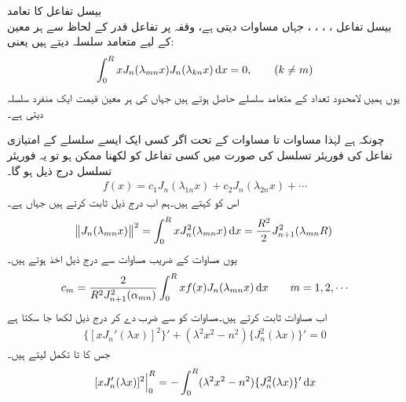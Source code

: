 \quad بیسل تفاعل کا تعامد\\
بیسل تفاعل ، ، ، ، جہاں  مساوات   دیتی ہے،  وقفہ  پر تفاعل قدر  کے لحاظ سے ہر معین  کے لیے متعامد سلسلہ دیتے ہیں یعنی:
\begin{align}
\int_0^R xJ_n(\lambda_{mn}x) J_n(\lambda_{kn}x)\dif x=0,\quad \quad (k\ne m)
\end{align}
  یوں ہمیں لامحدود تعداد کے متعامد سلسلے حاصل ہوتے ہیں جہاں  کی ہر معین قیمت ایک منفرد سلسلہ دیتی ہے۔

چونکہ  ہے لہٰذا مساوات  تا مساوات  کے تحت اگر کسی ایک ایسے سلسلے  کے امتیازی تفاعل  کی فوریئر تسلسل کی صورت میں کسی  تفاعل  کو لکھنا ممکن ہو تو یہ فوریئر تسلسل درج ذیل ہو گا۔
\begin{align}\label{مساوات_طاقتی_فوریئر_بیسل_الف}
f(x)=c_1J_n(\lambda_{1n}x)+c_2J_n(\lambda_{2n}x)+\cdots
\end{align}
اس کو  کہتے ہیں۔ہم اب درج ذیل ثابت کرتے ہیں جہاں  ہے۔
\begin{align}\label{مساوات_طاقتی_فوریئر_بیسل_ب}
\norm{J_n(\lambda_{mn}x)}^2=\int_0^R xJ^2_n(\lambda_{mn}x)\dif x=\frac{R^2}{2}J^2_{n+1}(\lambda_{mn}R)
\end{align} 
یوں مساوات  کے  ضریب   مساوات  سے درج ذیل اخذ ہوتے ہیں۔
 \begin{align}\label{مساوات_طاقتی_فوریئر_بیسل_عددی_سر}
c_m=\frac{2}{R^2J^2_{n+1}(\alpha_{mn})}\int_0^R xf(x)J_n(\lambda_{mn}x)\dif x\quad \quad m=1,2,\cdots
\end{align}
اب مساوات  ثابت کرتے ہیں۔مساوات  کو  سے  ضرب دے کر  درج ذیل لکھا جا سکتا ہے
\begin{align*}
\{[xJ_n'(\lambda x)]^2\}'+(\lambda^2x^2-n^2)\{J_n^2(\lambda x)\}'=0
\end{align*}
جس کا  تا  تکمل لیتے ہیں۔
\begin{align}\label{مساوات_طاقتی_فوریئر_بیسل_پ}
\left.[xJ_n'(\lambda x)]^2\right|_0^R=-\int_0^R(\lambda^2x^2-n^2)\{J_n^2(\lambda x)\}' \dif x
\end{align}

